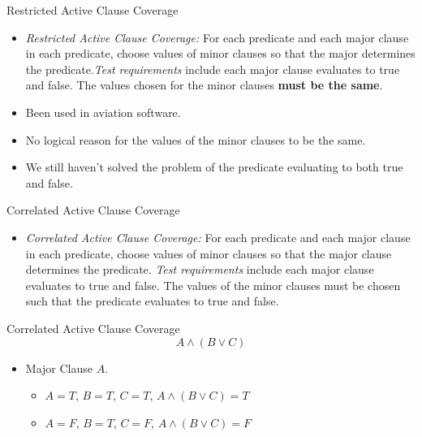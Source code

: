 \documentclass{beamer}
\begin{document}
\begin{frame}{Restricted Active Clause Coverage}
  \begin{itemize}
  \item {\em Restricted Active Clause Coverage:} For each predicate
    and each major clause in each predicate, choose values of minor
    clauses so that the major determines the predicate.{\it Test
    requirements} include each major clause evaluates to true and
    false. The values chosen for the minor clauses {\bf must be the
      same}.
  \item Been used in aviation software. 
  \item No logical reason for the values of the minor clauses to be
    the same. 
  \item We still haven't solved the problem of the predicate
    evaluating to both true and false.
  \end{itemize}
  
\end{frame}
\begin{frame}{Correlated Active Clause Coverage}
  \begin{itemize}
  \item {\em Correlated Active Clause Coverage:} For each predicate
    and each major clause in each predicate, choose values of minor
    clauses so that the major clause determines the predicate. {\it Test
    requirements} include each major clause evaluates to true and
    false. The values of the minor clauses must be chosen such that
    the predicate evaluates to true and false.
  \end{itemize}
\end{frame}
\begin{frame}{Correlated Active Clause Coverage}
  \[
   A \land (B \lor C)
  \]
  \begin{itemize}
  \item Major Clause $A$.
    \begin{itemize}
    \item $A=T$, $B=T$, $C=T$, $A\land (B\lor C)=T$
    \item $A=F$, $B=T$, $C=F$, $A\land (B\lor C)=F$
    \end{itemize}
  \end{itemize}
\end{frame}
\end{document}
